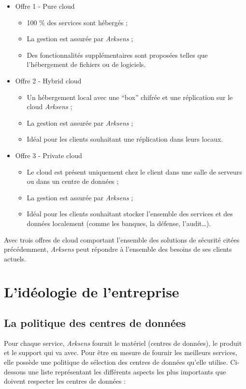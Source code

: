 \documentclass[a4paper,10pt, twoside]{report}
\begin{document}
\begin{spacing}{1.2}
\begin{itemize}
  \item Offre 1 - Pure cloud
  \noindent
  \begin{itemize}
    \item 100 \% des services sont hébergés ;
    \item La gestion est assurée par \textit{Arksens} ;
    \item Des fonctionnalités supplémentaires sont proposées telles que
    l'hébergement de fichiers ou de logiciels.
  \end{itemize}
  \item Offre 2 - Hybrid cloud
  \noindent
  \begin{itemize}
    \item Un hébergement local avec une ``box'' chifrée et une
    réplication sur le cloud \textit{Arksens} ;
    \item La gestion est assurée par \textit{Arksens} ;
    \item Idéal pour les clients souhaitant une réplication dans leurs
    locaux.
  \end{itemize}
  \item Offre 3 - Private cloud
  \noindent
  \begin{itemize}
    \item Le cloud est présent uniquement chez le client dans une salle de
    serveurs ou dans un centre de données ;
    \item La gestion est assurée par \textit{Arksens} ;
    \item Idéal pour les clients souhaitant stocker l'ensemble des services
    et des données localement (comme les banques, la défense,
    l'audit\ldots).
  \end{itemize}
\end{itemize}

Avec trois offres de cloud comportant l'ensemble des solutions de sécurité
citées précédemment, \textit{Arksens} peut répondre à l'ensemble des besoins
de ses clients actuels.

\section{L'idéologie de l'entreprise}
\subsection{La politique des centres de données}

Pour chaque service, \textit{Arksens} fournit le matériel (centres de
données), le produit et le support qui va avec. Pour être en mesure de
fournir les meilleurs services, elle possède une politique de sélection des
centres de données qu'elle utilise. Ci-dessous une liste représentant les
différents aspects les plus importants que doivent respecter les centres de
données :


\end{spacing}
\end{document}
